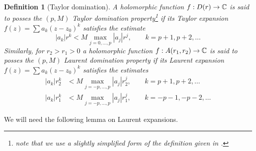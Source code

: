 \documentclass[reqno]{amsart}
\newtheorem{Def}[Cor]{Definition}{\bfseries}{\rmfamily}
\renewcommand\~[1]{\widetilde{#1}}
\begin{document}
\begin{Def}[Taylor domination]
  A holomorphic function $f:D(r)\to{\mathbb C}$ is said to posses the $(p,M)$
  Taylor domination property\footnote{note that we use a slightly
    simplified form of the definition given in
    .} \cite{by:domination} if its Taylor
  expansion $f(z)=\sum a_k(z-z_0)^k$ satisfies the estimate
  \begin{equation}
    |a_k| r^k < M \max_{j=0,\ldots,p} |a_j| r^j, \qquad k=p+1,p+2,\ldots 
  \end{equation}
  Similarly, for $r_2>r_1>0$ a holomorphic function $f:A(r_1,r_2)\to{\mathbb C}$
  is said to posses the $(p,M)$ Laurent domination property if its
  Laurent expansion $f(z)=\sum a_k(z-z_0)^k$ satisfies the estimates
  \begin{equation}
    \begin{aligned}
      |a_k| r_2^k &< M \max_{j=-p,\ldots,p} |a_j| r_2^j, \qquad
      k=p+1,p+2,\ldots \\
      |a_k| r_1^k &< M \max_{j=-p,\ldots,p} |a_j| r_1^j, \qquad
      k=-p-1,-p-2,\ldots
    \end{aligned}  
  \end{equation}
\end{Def}

We will need the following lemma on Laurent expansions.
\end{document}
